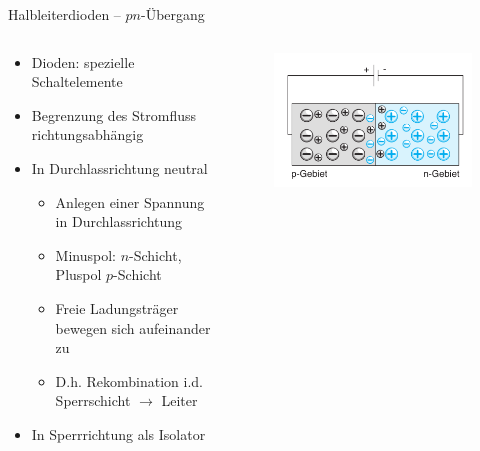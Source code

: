 \documentclass[12pt%
,aspectratio=169%
]{beamer}
\begin{document}
\begin{frame}{Halbleiterdioden -- $pn$-Übergang}
\begin{columns}[T] %
\begin{column}{.48\textwidth}
\begin{itemize}
	\item Dioden: spezielle Schaltelemente
	\item Begrenzung des Stromﬂuss richtungsabhängig
	\item In Durchlassrichtung neutral
	\begin{itemize}
		\item Anlegen einer Spannung in Durchlassrichtung
		\item Minuspol: $n$-Schicht, Pluspol $p$-Schicht
		\item Freie Ladungsträger bewegen sich aufeinander zu
		\item D.h. Rekombination i.d. Sperrschicht $\to$ Leiter
	\end{itemize}
	\item In Sperrrichtung als Isolator
\end{itemize}
\end{column}%
\hfill%
\begin{column}{.48\textwidth}
\begin{figure}
\center
\includegraphics[scale=0.5]{pictures/durchlass}
\end{figure}
\end{column}%
\end{columns}
\end{frame}
\end{document}
